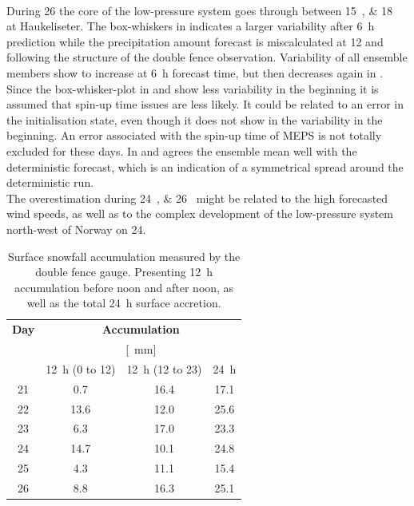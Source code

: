 \\
During \SI{26}{\dec} the core of the low-pressure system goes through between \SIlist{15;18}{\UTC} at Haukeliseter. The box-whiskers in  indicates a larger variability after \SI{6}{\hour} prediction while the precipitation amount forecast is miscalculated at \SI{12}{\UTC} and following the structure of the double fence observation. Variability of all ensemble members show to increase at \SI{6}{\hour} forecast time, but then decreases again in .  
\\
Since the box-whisker-plot in  and  show less variability in the beginning it is assumed that spin-up time issues are less likely. It could be related to an error in the initialisation state, even though it does not show in the variability in the beginning. An error associated with the spin-up time of MEPS is not totally excluded for these days. In  and  agrees the ensemble mean well with the deterministic forecast, which is an indication of a symmetrical spread around the deterministic run. 
\\ 
The overestimation during \SIlist{24;26}{\dec} might be related to the high forecasted wind speeds, as well as to the complex development of the low-pressure system north-west of Norway on \SI{24}{\dec}.
\\
\begin{table}[h]
	\begin{center}
		\caption{Surface snowfall accumulation measured by the double fence gauge. Presenting \SI{12}{\hour} accumulation before noon and after noon, as well as the total \SI{24}{\hour} surface accretion. }\label{tab:sfc_acc}
		\begin{tabular}{c|c|c|c}
			\hline \hline
			\textbf{Day} & \multicolumn{3}{c}{\textbf{Accumulation}} \\ 
			& \multicolumn{3}{c}{[\SI{}{\mm}]} \\ \hline
			& \SI{12}{\hour} (\footnotesize{\num{0} to \SI{12}{\UTC}}) & \SI{12}{\hour} (\footnotesize{\num{12} to \SI{23}{\UTC}}) & \SI{24}{\hour} \\ \hline \hline
			\SI{21}{\dec} & \num{0.7} &  \num{16.4} & \num{17.1} \\ \hline
			\SI{22}{\dec} & \num{13.6} &  \num{12.0} & \num{25.6} \\ \hline
			\SI{23}{\dec} & \num{6.3} &  \num{17.0} & \num{23.3} \\ \hline
			\SI{24}{\dec} & \num{14.7} &  \num{10.1} & \num{24.8} \\ \hline
			\SI{25}{\dec} & \num{4.3} &  \num{11.1} & \num{15.4} \\ \hline
			\SI{26}{\dec} & \num{8.8} &  \num{16.3} & \num{25.1} \\ 
			\hline \hline
		\end{tabular}
	\end{center}
\end{table}
